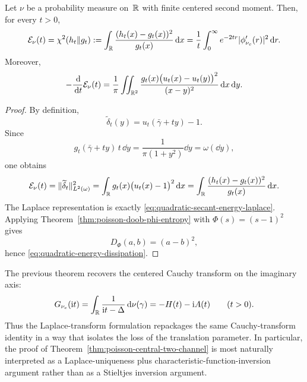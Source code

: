 \begin{corollary}\label{cor:quadratic-energy-chi-square}
Let $\nu$ be a probability measure on~$\mathbb{R}$ with finite centered second
moment.  Then, for every $t>0$,
\begin{equation}\label{eq:quadratic-energy-chi-square}
\mathcal E_\nu(t)
=
\chi^2(h_t\|g_t)
:=
\int_{\mathbb{R}}\frac{(h_t(x)-g_t(x))^2}{g_t(x)}\,\mathrm{d} x
=
\frac{1}{t}\int_0^\infty e^{-2tr}\lvert \phi_{\nu_c}'(r)\rvert^2\,\mathrm{d} r.
\end{equation}
Moreover,
\begin{equation}\label{eq:quadratic-energy-dissipation}
-\frac{\,\mathrm{d}}{\,\mathrm{d} t}\mathcal E_\nu(t)
=
\frac{1}{\pi}\iint_{\mathbb{R}^2}
\frac{g_t(x)\bigl(u_t(x)-u_t(y)\bigr)^2}{(x-y)^2}\,\mathrm{d} x\,\mathrm{d} y.
\end{equation}
\end{corollary}

\begin{proof}
By definition,
\[
\widetilde\delta_t(y)=u_t(\bar\gamma+ty)-1.
\]
Since
\[
g_t(\bar\gamma+ty)\,t\,\dd y
=\frac{1}{\pi(1+y^2)}\dd y
=\omega(\dd y),
\]
one obtains
\[
\mathcal E_\nu(t)
=\|\widetilde\delta_t\|_{L^2(\omega)}^2
=\int_{\mathbb{R}}g_t(x)\bigl(u_t(x)-1\bigr)^2\,\mathrm{d} x
=\int_{\mathbb{R}}\frac{(h_t(x)-g_t(x))^2}{g_t(x)}\,\mathrm{d} x.
\]
The Laplace representation is exactly
\eqref{eq:quadratic-secant-energy-laplace}.  Applying
Theorem~\ref{thm:poisson-doob-phi-entropy} with
$\Phi(s)=(s-1)^2$ gives
\[
D_\Phi(a,b)=(a-b)^2,
\]
hence \eqref{eq:quadratic-energy-dissipation}.
\end{proof}

\begin{remark}
The previous theorem recovers the centered Cauchy transform on the
imaginary axis:
\[
G_{\nu_c}(\mathrm{i} t)
=\int_{\mathbb{R}}\frac{1}{\mathrm{i} t-\Delta}\,\mathrm{d}\nu(\gamma)
=-H(t)-\mathrm{i} A(t)
\qquad(t>0).
\]
Thus the Laplace-transform formulation repackages the same
Cauchy-transform identity in a way that isolates the loss of the
translation parameter.  In particular, the proof of
Theorem~\ref{thm:poisson-central-two-channel} is most naturally
interpreted as a Laplace-uniqueness plus
characteristic-function-inversion argument rather than as a Stieltjes
inversion argument.
\end{remark}
